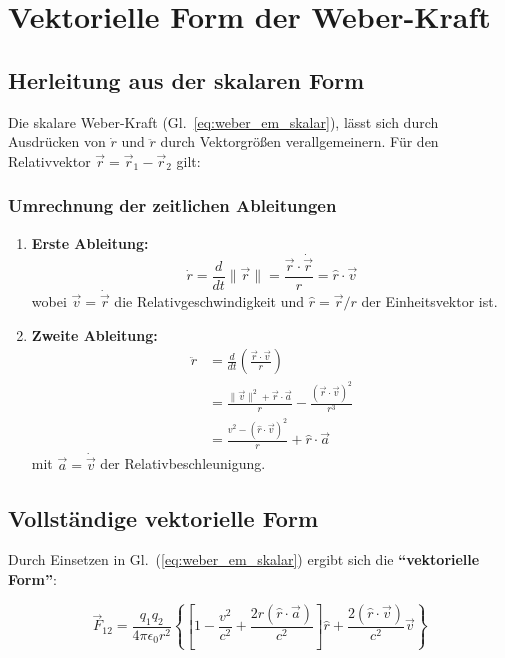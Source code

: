 \section{Vektorielle Form der Weber-Kraft}
\subsection{Herleitung aus der skalaren Form}

Die skalare Weber-Kraft (Gl.~\ref{eq:weber_em_skalar}), lässt sich durch Ausdrücken von $\dot{r}$ und $\ddot{r}$ durch Vektorgrößen verallgemeinern.
Für den Relativvektor $\vec{r} = \vec{r}_1 - \vec{r}_2$ gilt:

\subsubsection{Umrechnung der zeitlichen Ableitungen}
\begin{enumerate}
\item \textbf{Erste Ableitung:}
\begin{equation}
\dot{r} = \frac{d}{dt}\|\vec{r}\| = \frac{\vec{r} \cdot \dot{\vec{r}}}{r} = \hat{r} \cdot \vec{v}
\end{equation}
wobei $\vec{v} = \dot{\vec{r}}$ die Relativgeschwindigkeit und $\hat{r} = \vec{r}/r$ der Einheitsvektor ist.

\item \textbf{Zweite Ableitung:}
\begin{align}
\ddot{r} &= \frac{d}{dt}\left(\frac{\vec{r} \cdot \vec{v}}{r}\right) \nonumber \\
&= \frac{\|\vec{v}\|^2 + \vec{r} \cdot \vec{a}}{r} - \frac{(\vec{r} \cdot \vec{v})^2}{r^3} \nonumber \\
&= \frac{v^2 - (\hat{r} \cdot \vec{v})^2}{r} + \hat{r} \cdot \vec{a}
\end{align}
mit $\vec{a} = \dot{\vec{v}}$ der Relativbeschleunigung.
\end{enumerate}

\subsection{Vollständige vektorielle Form}
Durch Einsetzen in Gl.~(\ref{eq:weber_em_skalar}) ergibt sich die \textbf{\enquote{vektorielle Form}}:

\begin{equation}
\vec{F}_{12} = \frac{q_1 q_2}{4\pi\epsilon_0 r^2} \left\{
\left[1 - \frac{v^2}{c^2} + \frac{2r(\hat{r} \cdot \vec{a})}{c^2}\right]\hat{r} + \frac{2(\hat{r} \cdot \vec{v})}{c^2}\vec{v}
\right\}
\label{eq:weber_vector}
\end{equation}

